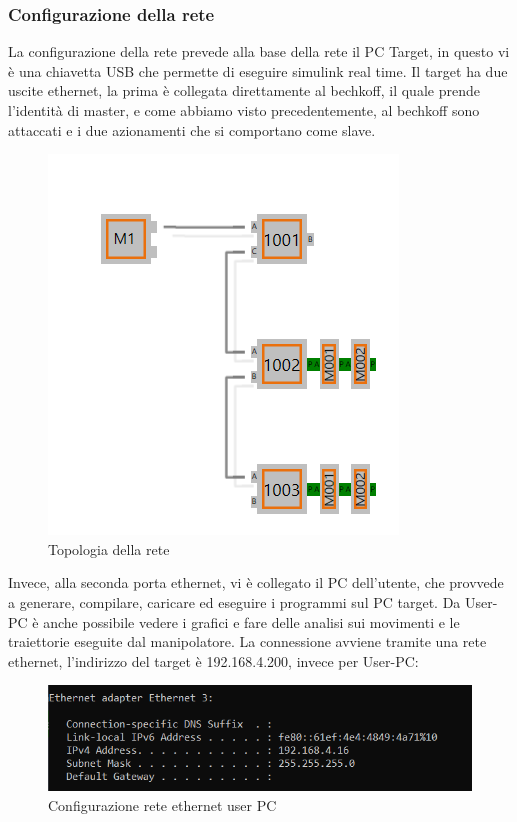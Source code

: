 \subsubsection{Configurazione della rete}
La configurazione della rete prevede alla base della rete il PC Target, in questo vi è una chiavetta USB che permette di eseguire simulink real time. Il target ha due uscite ethernet, la prima è collegata direttamente al bechkoff, il quale prende l'identità di master, e come abbiamo visto precedentemente, al bechkoff sono attaccati e i due azionamenti che si comportano come slave.
\begin{figure}[ht]
\begin{center}
    \includegraphics[scale=0.7]{Immagini/Sperimentale/network topology.PNG}
    \caption{Topologia della rete}
\end{center}
\end{figure}
Invece, alla seconda porta ethernet, vi è collegato il PC dell'utente, che provvede a generare, compilare, caricare ed eseguire i programmi sul PC target. Da User-PC è anche possibile vedere i grafici e fare delle analisi sui movimenti e le traiettorie eseguite dal manipolatore. La connessione avviene tramite una rete ethernet, l'indirizzo del target è 192.168.4.200, invece per User-PC:
\begin{figure}[ht]
\begin{center}
    \includegraphics[scale=0.7]{Immagini/Sperimentale/ConfEthernet.png}
    \caption{Configurazione rete ethernet user PC}
\end{center}
\end{figure}
